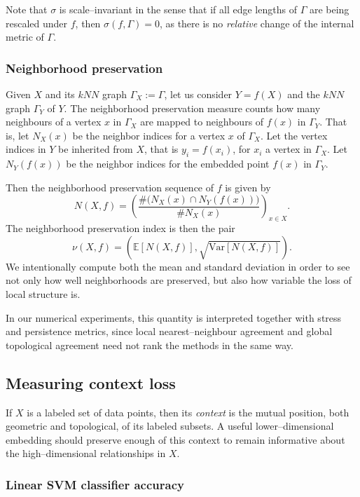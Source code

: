\documentclass[11pt]{article}
\begin{document}
Note that $\sigma$ is scale--invariant in the sense that if all edge lengths of $\Gamma$ are being rescaled under $f$, then  $\sigma(f, \Gamma) = 0$, as there is no \textit{relative} change of the internal metric of $\Gamma$.

\subsubsection{Neighborhood preservation}

Given $X$ and its $kNN$ graph $\Gamma_X := \Gamma$, let us consider $Y = f(X)$ and the $kNN$ graph $\Gamma_Y$ of $Y$. The neighborhood preservation measure counts how many neighbours of a vertex $x$ in $\Gamma_X$ are mapped to neighbours of $f(x)$ in $\Gamma_Y$. That is, let $N_X(x)$ be the neighbor indices for a vertex $x$ of $\Gamma_X$. Let the vertex indices in $Y$ be inherited from $X$, that is  $y_i = f(x_i)$, for $x_i$ a vertex in $\Gamma_X$. Let $N_Y(f(x))$ be the neighbor indices for the embedded point $f(x)$ in $\Gamma_Y$.

Then the neighborhood preservation sequence of $f$ is given by
\[
N(X, f) = \left( \frac{\# \bigl(N_X(x)\cap N_Y(f(x))\bigr)}{\# N_X(x)} \right)_{x \in X}.
\]
The neighborhood preservation index is then the pair 
\[
\nu(X, f) = \left( \mathbb{E}[N(X,f)], \sqrt{\mathrm{Var}[N(X,f)]} \right). 
\]
We intentionally compute both the mean and standard deviation in order to see not only how well neighborhoods are preserved, but also how variable the loss of local structure is. 

In our numerical experiments, this quantity is interpreted together with stress and persistence metrics, since local nearest--neighbour agreement and global topological agreement need not rank the methods in the same way.   


\subsection{Measuring context loss}

If $X$ is a labeled set of data points, then its \textit{context} is the mutual position, both geometric and topological, of its labeled subsets. A useful lower--dimensional embedding should preserve enough of this context to remain informative about the high--dimensional relationships in $X$.

\subsubsection{Linear SVM classifier accuracy}
\end{document}
